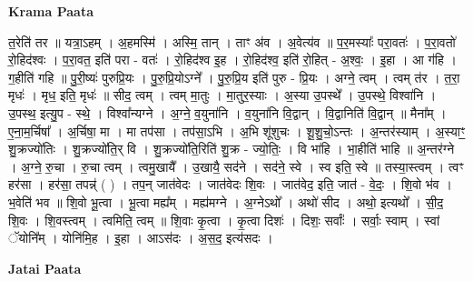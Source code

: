 \documentclass[17pt]{extarticle}
\begin{document}
\textbf{Krama Paata} \newline

त॒रेति॑ तर ॥ यत्रा॒ऽहम् । अ॒हमस्मि॑ । अस्मि॒ तान् । ताꣳ अ॑व । अ॒वेत्य॑व ॥ प॒र॒मस्याः᳚ परा॒वतः॑ । प॒रा॒वतो॑ रो॒हिद॑श्वः । प॒रा॒वत॒ इति॑ परा - वतः॑ । रो॒हिद॑श्व इ॒ह । रो॒हिद॑श्व॒ इति॑ रो॒हित् - अ॒श्वः॒ । इ॒हा । आ ग॑हि । ग॒हीति॑ गहि ॥ पु॒री॒ष्यः॑ पुरुप्रि॒यः । पु॒रु॒प्रि॒योऽग्ने᳚ । पु॒रु॒प्रि॒य इति॑ पुरु - प्रि॒यः । अग्ने॒ त्वम् । त्वम् त॑र । त॒रा॒ मृधः॑ । मृध॒ इति॒ मृधः॑ ॥ सीद॒ त्वम् । त्वम् मा॒तुः । मा॒तुर॒स्याः । अ॒स्या उ॒पस्थे᳚ । उ॒पस्थे॒ विश्वा॑नि । उ॒पस्थ॒ इत्यु॒प - स्थे॒ । विश्वा᳚न्यग्ने । अ॒ग्ने॒ व॒युना॑नि । व॒युना॑नि वि॒द्वान् । वि॒द्वानिति॑ वि॒द्वान् ॥ मैना᳚म् । ए॒ना॒म॒र्चिषा᳚ । अ॒र्चिषा॒ मा । मा तप॑सा । तप॑सा॒ऽभि । अ॒भि शू॑शुचः । शू॒शु॒चो॒ऽन्तः । अ॒न्तर॑स्याम् । अ॒स्याꣳ॒॒ शु॒क्रज्यो॑तिः । शु॒क्रज्यो॑ति॒र् वि । शु॒क्रज्यो॑ति॒रिति॑ शु॒क्र - ज्यो॒तिः॒ । वि भा॑हि । भा॒हीति॑ भाहि ॥ अ॒न्तर॑ग्ने । अ॒ग्ने॒ रु॒चा । रु॒चा त्वम् । त्वमु॒खायै᳚ । उ॒खायै॒ सद॑ने । सद॑ने॒ स्वे । स्व इति॒ स्वे ॥ तस्या॒स्त्वम् । त्वꣳ हर॑सा । हर॑सा॒ तपन्न्॑ ( ) । तप॒न् जात॑वेदः । जात॑वेदः शि॒वः । जात॑वेद॒ इति॒ जात॑ - वे॒दः॒ । शि॒वो भ॑व । भ॒वेति॑ भव ॥ शि॒वो भू॒त्वा । भू॒त्वा मह्य᳚म् । मह्य॑मग्ने । अ॒ग्नेऽथो᳚ । अथो॑ सीद । अथो॒ इत्यथो᳚ । सी॒द॒ शि॒वः । शि॒वस्त्वम् । त्वमिति॒ त्वम् ॥ शि॒वाः कृ॒त्वा । कृ॒त्वा दिशः॑ । दिशः॒ सर्वाः᳚ । सर्वाः॒ स्वाम् । स्वां ॅयोनि᳚म् । योनि॑मि॒ह । इ॒हा । आऽस॑दः । अ॒स॒द॒ इत्य॑सदः । \newline

\textbf{Jatai Paata} \newline
\end{document}
